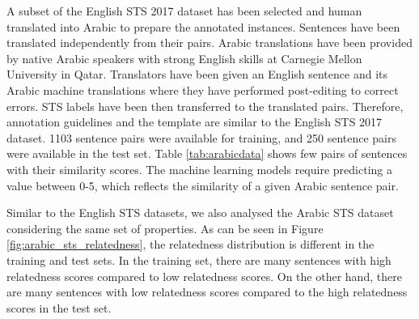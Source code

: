 \begin{enumerate}
A subset of the English STS 2017 dataset has been selected and human translated into Arabic to prepare the annotated instances. Sentences have been translated independently from their pairs. Arabic translations have been provided by native Arabic speakers with strong English skills at Carnegie Mellon University in Qatar. Translators have been given an English sentence and its Arabic machine translations where they have performed post-editing to correct errors. STS labels have been then transferred to the translated pairs. Therefore, annotation guidelines and the template are similar to the English STS 2017 dataset. 1103 sentence pairs were available for training, and 250 sentence pairs were available in the test set. Table \ref{tab:arabicdata} shows few pairs of sentences with their similarity scores. The machine learning models require predicting a value between 0-5, which reflects the similarity of a given Arabic sentence pair. 



Similar to the English STS datasets, we also analysed the Arabic STS dataset considering the same set of properties. As can be seen in Figure \ref{fig:arabic_sts_relatedness}, the relatedness distribution is different in the training and test sets. In the training set, there are many sentences with high relatedness scores compared to low relatedness scores. On the other hand,  there are many sentences with low relatedness scores compared to the high relatedness scores in the test set.



\end{enumerate}

